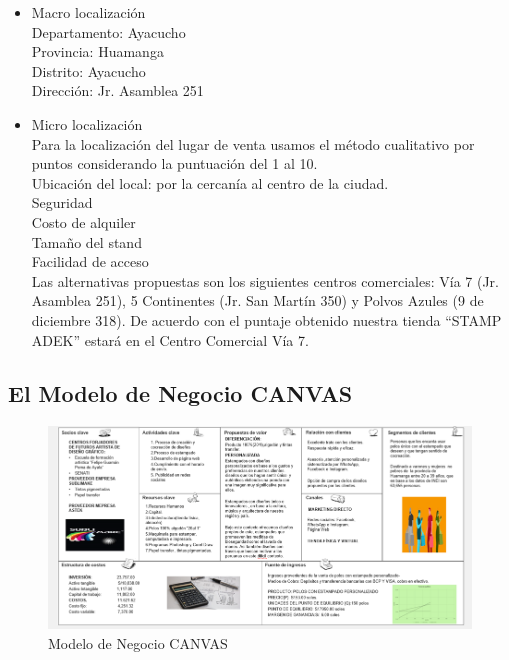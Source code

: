 \documentclass[a4paper,openright,12pt]{book}
\begin{document}
\begin{itemize}
\item Macro localización \\
Departamento: Ayacucho \\
Provincia: Huamanga \\
Distrito: Ayacucho \\
Dirección: Jr. Asamblea 251
\item Micro localización \\
Para la localización del lugar de venta usamos el método cualitativo por puntos considerando la puntuación del 1 al 10. \\
Ubicación del local: por la cercanía al centro de la ciudad. \\
Seguridad \\
Costo de alquiler \\
Tamaño del stand \\
Facilidad de acceso \\
Las alternativas propuestas son los siguientes centros comerciales: Vía 7 (Jr. Asamblea 251), 5 Continentes (Jr. San Martín 350) y Polvos Azules (9 de diciembre 318). De acuerdo con el puntaje obtenido nuestra tienda “STAMP ADEK” estará en el Centro Comercial Vía 7.
\end{itemize}

\newpage
\begin{landscape}

\section{El Modelo de Negocio CANVAS}

\begin{figure}[h]
\centering
\raggedright
\includegraphics[scale=0.8]{Figuras/ModeloNegocioCANVAS.png}
\caption{Modelo de Negocio CANVAS}
\label{figura1}
\end{figure}
\end{landscape}
\end{document}
